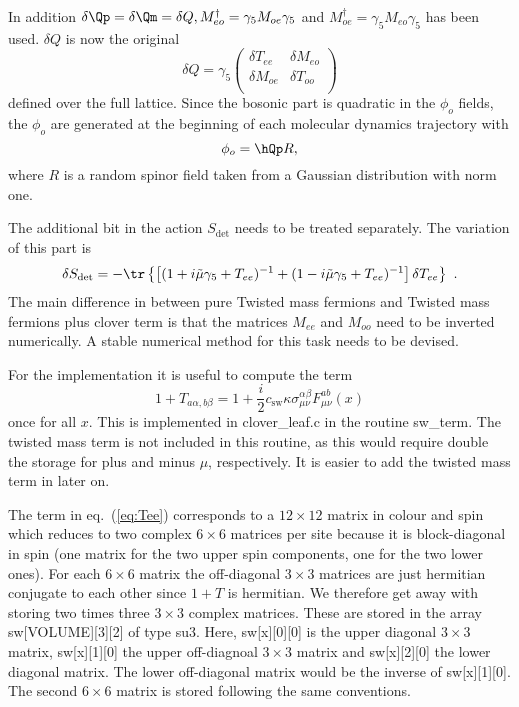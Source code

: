 In addition $\delta\Qp = \delta\Qm = \delta Q, M_{eo}^\dagger =
\gamma_5 M_{oe}\gamma_5$ and $M_{oe}^\dagger = \gamma_5
M_{eo}\gamma_5$ has been used.  $\delta Q$
is now the original
\[
\delta Q = \gamma_5
\begin{pmatrix}
  \delta T_{ee} & \delta M_{eo} \\
  \delta M_{oe} & \delta T_{oo} \\
\end{pmatrix}
\]
defined over the full lattice. Since the bosonic part
is quadratic in the $\phi_o$ fields, the $\phi_o$ are generated at the
beginning of each molecular dynamics trajectory with
\begin{equation}
  \label{eq:eosw10}
  \phi_o = \hQp R,
\end{equation}
where $R$ is a random spinor field taken from a Gaussian distribution
with norm one.

The additional bit in the action $S_{\det}$ needs to be treated
separately. The variation of this part is
\begin{equation}
  \label{eq:eosw11}
  \delta S_{\det} = -\tr \left\{ \left[(1+i\tilde\mu\gamma_5 + T_{ee})^{-1}  +
    (1-i\tilde\mu\gamma_5 + T_{ee})^{-1}\right] \delta T_{ee} \right\} \ . 
\end{equation}
The main difference in between pure Twisted mass fermions and Twisted
mass fermions plus clover term is that the matrices $M_{ee}$ and
$M_{oo}$ need to be inverted numerically. A stable numerical method
for this task needs to be devised.

For the implementation it is useful to compute the term
\begin{equation}
  \label{eq:Tee}
  1+T_{a\alpha,b\beta} = 1 + \frac{i}{2} c_\mathrm{sw}
  \kappa\sigma_{\mu\nu}^{\alpha\beta}F_{\mu\nu}^{ab}(x)
\end{equation}  
once for all $x$. This is implemented in {\ttfamily clover\_leaf.c} in
the routine {\ttfamily sw\_term}. The twisted mass term is not
included in this routine, as this would require double the storage for
plus and minus $\mu$, respectively. It is easier to add the twisted
mass term in later on. 

The term in eq.~(\ref{eq:Tee}) corresponds to a $12\times12$ matrix
in colour and spin which reduces to two complex $6\times6$ matrices
per site because it is block-diagonal in spin (one matrix for the two
upper spin components, one for the two lower ones). 
For each $6\times6$ matrix the off-diagonal $3\times3$
matrices are just hermitian conjugate to each other since $1+T$ is hermitian.
We therefore get away with storing two times three 
$3\times3$ complex matrices. These are stored in the array {\ttfamily
  sw[VOLUME][3][2]} of type {\ttfamily su3}. Here, {\ttfamily
  sw[x][0][0]} is the upper diagonal $3\times3$ matrix, {\ttfamily
  sw[x][1][0]} the upper off-diagnoal $3\times3$ matrix and {\ttfamily
  sw[x][2][0]} the lower diagonal matrix. The lower off-diagonal
matrix would be the inverse of {\ttfamily sw[x][1][0]}. The second
$6\times6$ matrix is stored following the same conventions.

